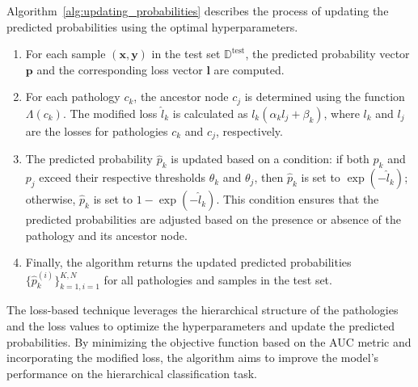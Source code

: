 \documentclass[review,1p,times,numbers]{elsarticle}
\begin{document}
Algorithm~\ref{alg:updating_probabilities} describes the process of updating the predicted probabilities using the optimal hyperparameters.
\begin{enumerate}
    \item For each sample $(\mathbf{x}, \mathbf{y})$ in the test set $\mathbb{D}^{\text{test}}$, the predicted probability vector $\mathbf{p}$ and the corresponding loss vector $\mathbf{l}$ are computed.
    \item For each pathology $c_k$, the ancestor node $c_j$ is determined using the function $\Lambda(c_k)$. The modified loss $\hat{l}_k$ is calculated as $l_k (\alpha_k l_j + \beta_k)$, where $l_k$ and $l_j$ are the losses for pathologies $c_k$ and $c_j$, respectively.
    \item The predicted probability $\hat{p}_k$ is updated based on a condition: if both $p_k$ and $p_j$ exceed their respective thresholds $\theta_k$ and $\theta_j$, then $\hat{p}_k$ is set to $\exp(-\hat{l}_k)$; otherwise, $\hat{p}_k$ is set to $1 - \exp(-\hat{l}_k)$. This condition ensures that the predicted probabilities are adjusted based on the presence or absence of the pathology and its ancestor node.
    \item Finally, the algorithm returns the updated predicted probabilities $\{\hat{p}_k^{(i)}\}_{k=1,i=1}^{K,N}$ for all pathologies and samples in the test set.
\end{enumerate}

The loss-based technique leverages the hierarchical structure of the pathologies and the loss values to optimize the hyperparameters and update the predicted probabilities. By minimizing the objective function based on the AUC metric and incorporating the modified loss, the algorithm aims to improve the model's performance on the hierarchical classification task.
\end{document}

